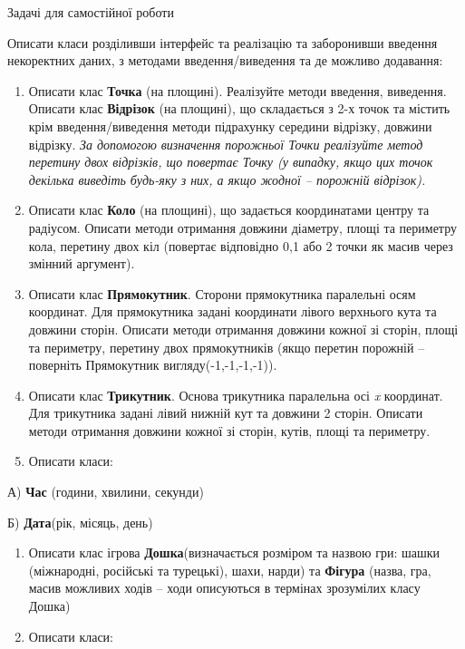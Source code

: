 \documentclass[]{article}
\begin{document}
Задачі для самостійної роботи

Описати класи розділивши інтерфейс та реалізацію та заборонивши введення
некоректних даних, з методами введення/виведення та де можливо
додавання:

\begin{enumerate}
\def\labelenumi{\arabic{enumi})}
\item
  Описати клас \textbf{Точка} (на площині). Реалізуйте методи введення,
  виведення. Описати клас \textbf{Відрізок} (на площині), що складається
  з 2-х точок та містить крім введення/виведення методи підрахунку
  середини відрізку, довжини відрізку. \emph{За допомогою визначення
  порожньої Точки реалізуйте метод перетину двох відрізків, що повертає
  Точку (у випадку, якщо цих точок декілька виведіть будь-яку з них, а
  якщо жодної -- порожній відрізок).}
\item
  Описати клас \textbf{Коло} (на площині), що задається координатами
  центру та радіусом. Описати методи отримання довжини діаметру, площі
  та периметру кола, перетину двох кіл (повертає відповідно 0,1 або 2
  точки як масив через змінний аргумент).
\item
  Описати клас \textbf{Прямокутник}. Сторони прямокутника паралельні
  осям координат. Для прямокутника задані координати лівого верхнього
  кута та довжини сторін. Описати методи отримання довжини кожної зі
  сторін, площі та периметру, перетину двох прямокутників (якщо перетин
  порожній -- поверніть Прямокутник вигляду(-1,-1,-1,-1)).
\item
  Описати клас \textbf{Трикутник}. Основа трикутника паралельна осі
  \emph{x} координат. Для трикутника задані лівий нижній кут та довжини
  2 сторін. Описати методи отримання довжини кожної зі сторін, кутів,
  площі та периметру.
\item
  Описати класи:
\end{enumerate}

А) \textbf{Час} (години, хвилини, секунди)

Б) \textbf{Дата}(рік, місяць, день)

\begin{enumerate}
\def\labelenumi{\arabic{enumi})}
\item
  Описати клас ігрова \textbf{Дошка}(визначається розміром та назвою
  гри: шашки (міжнародні, російські та турецькі), шахи, нарди) та
  \textbf{Фігура} (назва, гра, масив можливих ходів -- ходи описуються в
  термінах зрозумілих класу Дошка)
\item
  Описати класи:
\end{enumerate}
\end{document}
